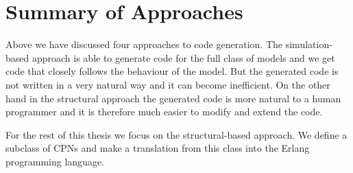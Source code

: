 \section{Summary of Approaches}
Above we have discussed four approaches to code generation. The simulation-based approach is able to generate code for the full class of models and we get code that closely follows the behaviour of the model. But the generated code is not written in a very natural way and it can become inefficient. On the other hand in the structural approach the generated code is more natural to a human programmer and it is therefore much easier to modify and extend the code.

For the rest of this thesis we focus on the structural-based approach. We define a subclass of CPNs and make a translation from this class into the Erlang programming language.
